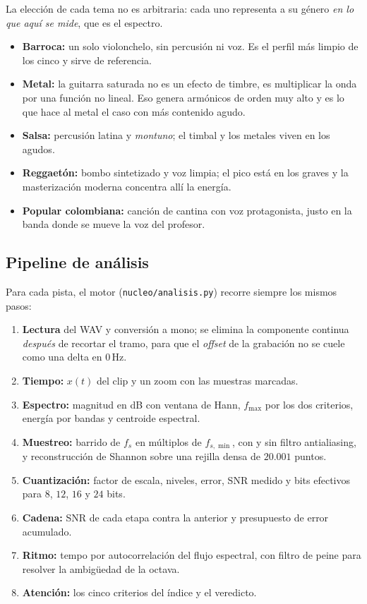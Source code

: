 \documentclass[11pt,a4paper]{article}
\newcommand{\fs}{f_s}
\newcommand{\fsmin}{f_{s,\min}}
\newcommand{\fmax}{f_{\max}}
\newcommand{\Hz}{\,\mathrm{Hz}}
\begin{document}
La elección de cada tema no es arbitraria: cada uno representa a su género
\emph{en lo que aquí se mide}, que es el espectro.

\begin{itemize}
  \item \textbf{Barroca:} un solo violonchelo, sin percusión ni voz. Es el
        perfil más limpio de los cinco y sirve de referencia.
  \item \textbf{Metal:} la guitarra saturada no es un efecto de timbre, es
        multiplicar la onda por una función no lineal. Eso genera armónicos de
        orden muy alto y es lo que hace al metal el caso con más contenido
        agudo.
  \item \textbf{Salsa:} percusión latina y \emph{montuno}; el timbal y los
        metales viven en los agudos.
  \item \textbf{Reggaetón:} bombo sintetizado y voz limpia; el pico está en los
        graves y la masterización moderna concentra allí la energía.
  \item \textbf{Popular colombiana:} canción de cantina con voz protagonista,
        justo en la banda donde se mueve la voz del profesor.
\end{itemize}

\subsection{Pipeline de análisis}

Para cada pista, el motor (\texttt{nucleo/analisis.py}) recorre siempre los
mismos pasos:

\begin{enumerate}
  \item \textbf{Lectura} del WAV y conversión a mono; se elimina la componente
        continua \emph{después} de recortar el tramo, para que el \emph{offset}
        de la grabación no se cuele como una delta en \(0\Hz\).
  \item \textbf{Tiempo:} \(x(t)\) del clip y un zoom con las muestras marcadas.
  \item \textbf{Espectro:} magnitud en dB con ventana de Hann, \(\fmax\) por
        los dos criterios, energía por bandas y centroide espectral.
  \item \textbf{Muestreo:} barrido de \(\fs\) en múltiplos de \(\fsmin\), con y
        sin filtro antialiasing, y reconstrucción de Shannon sobre una rejilla
        densa de \(20.001\) puntos.
  \item \textbf{Cuantización:} factor de escala, niveles, error, SNR medido y
        bits efectivos para \(8\), \(12\), \(16\) y \(24\) bits.
  \item \textbf{Cadena:} SNR de cada etapa contra la anterior y presupuesto de
        error acumulado.
  \item \textbf{Ritmo:} tempo por autocorrelación del flujo espectral, con
        filtro de peine para resolver la ambigüedad de la octava.
  \item \textbf{Atención:} los cinco criterios del índice y el veredicto.
\end{enumerate}
\end{document}
